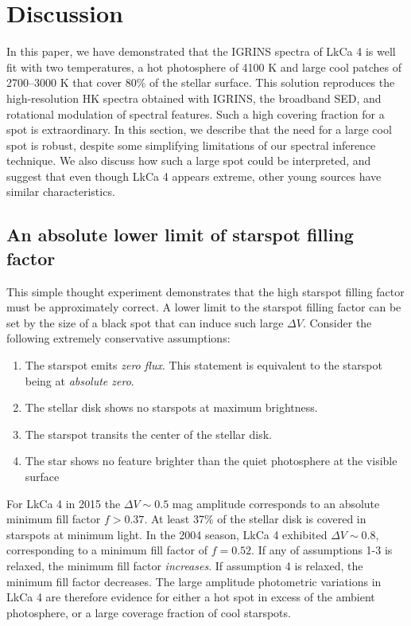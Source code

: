 \documentclass[twocolumn]{emulateapj}%
\begin{document}
\section{Discussion}


In this paper, we have demonstrated that the IGRINS spectra of LkCa 4 is well fit with two temperatures, a hot photosphere of 4100 K and large cool patches of 2700--3000 K that cover 80\% of the stellar surface.  This solution reproduces the high-resolution HK spectra obtained with IGRINS, the broadband SED, and rotational modulation of spectral features.  Such a high covering fraction for a spot is extraordinary.  In this section, we describe that the need for a large cool spot is robust, despite some simplifying limitations of our spectral inference technique.  We also discuss how such a large spot could be interpreted, and suggest that even though LkCa 4 appears extreme, other young sources have similar characteristics.


\subsection{An absolute lower limit of starspot filling factor} 

This simple thought experiment demonstrates that the high starspot filling factor must be approximately correct.  A lower limit to the starspot filling factor can be set by the size of a black spot that can induce such large $\Delta V$.  Consider the following extremely conservative assumptions:  \begin{enumerate}
  \item The starspot emits \emph{zero flux}.  This statement is equivalent to the starspot being at \emph{absolute zero}.
  \item The stellar disk shows no starspots at maximum brightness.
  \item The starspot transits the center of the stellar disk.
  \item The star shows no feature brighter than the quiet photosphere at the visible surface
\end{enumerate}

For LkCa 4 in 2015 the $\Delta V\sim 0.5$ mag amplitude corresponds to an absolute minimum fill factor $f>0.37$.  At least 37\% of the stellar disk is covered in starspots at minimum light.  In the 2004 season, LkCa 4 exhibited $\Delta V\sim 0.8$, corresponding to a minimum fill factor of $f=0.52$.  If any of assumptions 1-3 is relaxed, the minimum fill factor \emph{increases}.  If assumption 4 is relaxed, the minimum fill factor decreases.  The large amplitude photometric variations in LkCa 4 are therefore evidence for either a hot spot in excess of the ambient photosphere, or a large coverage fraction of cool starspots.  
\end{document}
